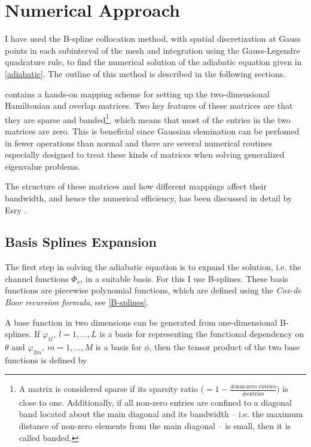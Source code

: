 \chapter{Numerical Approach}\label{chapter:5}
I have used the B-spline collocation method, with spatial discretization at Gauss points in each subinterval of the mesh and integration using the Gauss-Legendre quadrature rule, to find the numerical solution of the adiabatic equation given in \eqref{adiabatic}. The outline of this method is described in the following sections. 

 contains a hands-on mapping scheme for setting up the two-dimensional Hamiltonian and overlap matrices. Two key features of these matrices are that they are sparse and banded\footnote{A matrix is considered sparse if its sparsity ratio $\big(=1 - \frac{\# \text{non-zero entries}}{\#\text{entries}}\big)$ is close to one. Additionally, if all non-zero entries are confined to a diagonal band located about the main diagonal and its bandwidth -- i.e. the maximum distance of non-zero elements from the main diagonal -- is small, then it is called banded.}, which means that most of the entries in the two matrices are zero. This is beneficial since Gaussian elemination can be perfomed in fewer operations than normal and there are several numerical routines especially designed to treat these kinds of matrices when solving generalized eigenvalue problems. 

The structure of these matrices and how different mappings affect their bandwidth, and hence the numerical efficiency, has been discussed in detail by Esry \cite{Esry_thesis}.   

\section{Basis Splines Expansion}\label{section:BSexpansion}
The first step in solving the adiabatic equation is to expand the solution, i.e. the channel functions $\Phi_{\nu}$, in a suitable basis. For this I use B-splines. These basis functions are piecewise polynomial functions, which are defined using the \emph{Cox-de Boor recursion formula}, see \cref{B-splines}. 

A base function in two dimensions can be generated from one-dimensional B-splines. If $\varphi_{1l}, \ l= 1,\ldots,L$ is a basis for representing the functional dependency on $\theta$ and $\varphi_{2m}, \ m= 1,\ldots,M$ is a basis for $\phi$, then the tensor product of the two base functions is defined by

